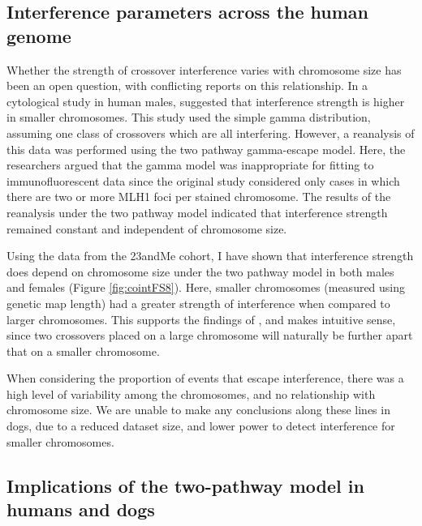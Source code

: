 \subsection{Interference parameters across the human genome}

Whether the strength of crossover interference varies with chromosome size has been an open question, with conflicting reports on this relationship.
In a cytological study in human males, \citet{Lian2008} suggested that interference strength is higher in smaller chromosomes. %
This study used the simple gamma distribution, assuming one class of crossovers which are all interfering.
However, a reanalysis of this data was performed using the two pathway gamma-escape model\cite{Housworth2009}.
Here, the researchers argued that the gamma model was inappropriate for fitting to immunofluorescent data since the original study considered only cases in which there are two or more MLH1 foci per stained chromosome.
The results of the reanalysis under the two pathway model indicated that interference strength remained constant and independent of chromosome size\cite{Housworth2009}.

Using the data from the 23andMe cohort, I have shown that interference strength does depend on chromosome size under the two pathway model in both males and females (Figure \ref{fig:cointFS8}).
Here, smaller chromosomes (measured using genetic map length) had a greater strength of interference when compared to larger chromosomes.
This supports the findings of \citet{Lian2008}, and
makes intuitive sense, since two crossovers placed on a large chromosome will naturally be further apart that on a smaller chromosome.

When considering the proportion of events that escape interference, there was a high level of variability among the chromosomes, and no relationship with chromosome size.
We are unable to make any conclusions along these lines in dogs, due to a reduced dataset size, and lower power to detect interference for smaller chromosomes.


\subsection{Implications of the two-pathway model in humans and dogs}

